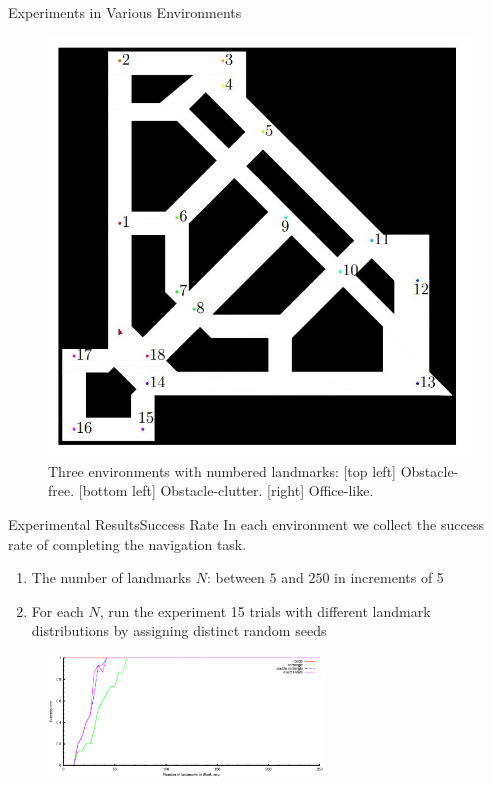 \documentclass[10pt]{beamer}
\begin{document}
\begin{frame}{Experiments in Various Environments}
\begin{figure}
\begin{minipage}[b]{0.45\textwidth}
    \includegraphics[scale=0.45]{figs/office}    
  \end{minipage}
  \caption{\scriptsize{Three environments with numbered landmarks: [top left]
    Obstacle-free. [bottom left] Obstacle-clutter. [right] Office-like.}}
  \label{fig:env}
\end{figure}
\end{frame}

\begin{frame}{Experimental Results}{Success Rate}
In each environment we collect the success rate of completing the navigation
task. 
\begin{enumerate}
\item The number of landmarks $N$: between $5$ and $250$ in increments of 5
\item For each $N$, run the experiment 15 trials with different landmark
  distributions by assigning distinct random seeds
\end{enumerate}
\begin{figure}
  \begin{center}
    \includegraphics[width=0.65\textwidth]{figs/exp_num_blank}
  \end{center}
  \label{fig:sucRate1}
\end{figure}
\end{frame}
\end{document}
